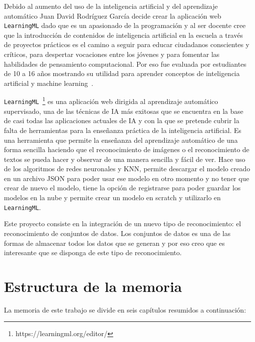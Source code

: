 \documentclass[a4paper, 12pt]{book}
\begin{document}
Debido al aumento del uso de la inteligencia artificial y del aprendizaje automático Juan David Rodríguez García decide crear la aplicación web \texttt{LearningML} dado que es un apasionado de la programación y al ser docente cree  que la introducción de contenidos de inteligencia artificial en la escuela a través de proyectos prácticos es el camino a seguir para educar ciudadanos conscientes y críticos, para despertar vocaciones entre los jóvenes y para fomentar las habilidades de pensamiento computacional. Por eso fue evaluada por estudiantes de 10 a 16 años mostrando su utilidad para aprender conceptos de inteligencia artificial y machine learning~\cite{Pagina_de_LearningML}.

\texttt{LearningML}~\footnote{https://learningml.org/editor/} es una aplicación web dirigida al aprendizaje automático supervisado, una de las técnicas de IA más exitosas que se encuentra en la base de casi todas las aplicaciones actuales de IA y con la que se pretende cubrir la falta de herramientas para la enseñanza práctica de la inteligencia artificial. 
Es una herramienta que permite la enseñanza del aprendizaje automático de una forma sencilla haciendo que el reconocimiento de imágenes o el reconocimiento de textos se pueda hacer y observar de una manera sencilla y fácil de ver. 
Hace uso de los algoritmos de redes neuronales y KNN, permite descargar el modelo creado en un archivo JSON para poder usar ese modelo en otro momento y no tener que crear de nuevo el modelo, tiene la opción de registrarse para poder guardar los modelos en la nube y permite crear un modelo en scratch y utilizarlo en \texttt{LearningML}.

Este proyecto consiste en la integración de un nuevo tipo de reconocimiento: el reconocimiento de conjuntos de datos. Los conjuntos de datos es una de las formas de almacenar todos los datos que se generan y por eso creo que es interesante que se disponga de este tipo de reconocimiento.


\section{Estructura de la memoria}
\label{sec:estructura}

La memoria de este trabajo se divide en seis capítulos resumidos a continuación:
\end{document}
